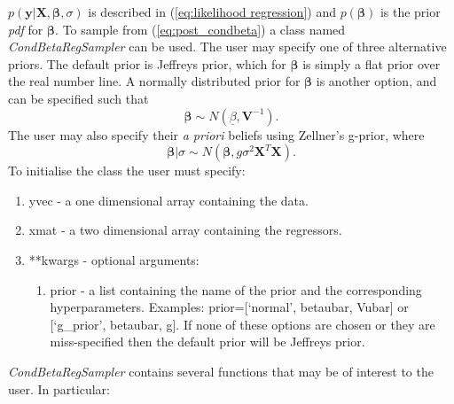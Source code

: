\documentclass[article]{jss}
\begin{document}
$p(\bm{y}|\bm{X},\bm{\beta},\sigma)$ is described in
(\ref{eq:likelihood regression}) and $p(\bm{\beta})$ is the prior
\emph{pdf} for $\bm{\beta}.$ To sample from (\ref{eq:post_condbeta}) a
class named \emph{CondBetaRegSampler} can be used. The user may
specify one of three alternative priors.  The default prior is
Jeffreys prior, which for $\bm{\beta}$ is simply a flat prior over
the real number line. A normally distributed prior for $\bm{\beta}$ is
another option, and can be specified such that\[ \bm{\beta}\sim
N\left(\underline{\beta},\bm{V}^{-1}\right).\] The user may also
specify their \emph{a priori} beliefs using Zellner's g-prior, where\[
\bm{\beta}|\sigma\sim
N\left(\bm{\beta},g\sigma^{2}\bm{X}^{T}\bm{X}\right).\] To initialise
the class the user must specify:
\begin{enumerate}
\item yvec - a one dimensional  array containing the data. 
\item xmat - a two dimensional  array containing the regressors. 
\item {*}{*}kwargs - optional arguments:

\begin{enumerate}
\item prior - a list containing the name of the prior and the
  corresponding hyperparameters. Examples: prior={[}`normal',
  betaubar, Vubar{]} or {[}`g\_prior', betaubar, g{]}. If none of
  these options are chosen or they are miss-specified then the default
  prior will be Jeffreys prior.
\end{enumerate}
\end{enumerate}
\emph{CondBetaRegSampler} contains several functions that may be of interest
to the user. In particular:
\end{document}
